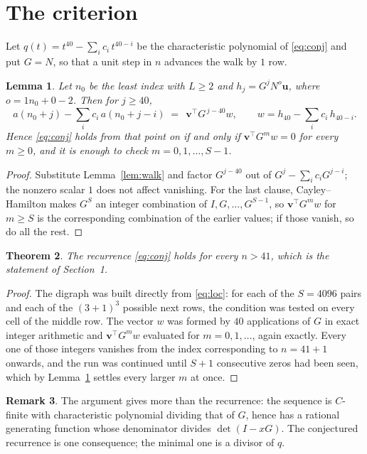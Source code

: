 \documentclass[11pt,a4paper]{article}
\theoremstyle{plain}
\newtheorem{theorem}{Theorem}
\newtheorem{lemma}[theorem]{Lemma}
\theoremstyle{definition}
\newtheorem{remark}[theorem]{Remark}
\begin{document}
\section{The criterion}

Let $q(t)=t^{40}-\sum_i c_i\,t^{40-i}$ be the characteristic polynomial of
\eqref{eq:conj} and put $G=N$, so that a unit step in $n$ advances the walk by
$1$ row.

\begin{lemma}\label{lem:crit}
Let $n_0$ be the least index with $L\ge2$ and $h_j=G^{j}N^{o}\mathbf{u}$, where
$o=1n_0+0-2$. Then for $j\ge40$,
\[
a(n_0+j)-\sum_i c_i\,a(n_0+j-i)\;=\;\,\mathbf{v}^{\!\top}G^{\,j-40}w,
\qquad w=h_{40}-\sum_i c_i\,h_{40-i} .
\]
Hence \eqref{eq:conj} holds from that point on if and only if
$\mathbf{v}^{\!\top}G^{m}w=0$ for every $m\ge0$, and it is enough to check
$m=0,1,\dots,S-1$.
\end{lemma}

\begin{proof}
Substitute Lemma~\ref{lem:walk} and factor $G^{j-40}$ out of
$G^{j}-\sum_ic_iG^{j-i}$; the nonzero scalar $1$ does not affect
vanishing. For the last clause, Cayley--Hamilton makes $G^{S}$ an integer combination of
$I,G,\dots,G^{S-1}$, so $\mathbf{v}^{\!\top}G^{m}w$ for $m\ge S$ is the corresponding
combination of the earlier values; if those vanish, so do all the rest.
\end{proof}

\begin{theorem}
The recurrence \eqref{eq:conj} holds for every $n>41$, which is the statement of
Section~1.
\end{theorem}

\begin{proof}
The digraph was built directly from \eqref{eq:loc}: for each of the $S=4096$ pairs and each
of the $(3+1)^{3}$ possible next rows, the condition was tested on every cell of
the middle row. The vector $w$ was formed by $40$ applications of $G$ in exact integer
arithmetic and $\mathbf{v}^{\!\top}G^{m}w$ evaluated for $m=0,1,\dots$, again exactly.
Every one of those integers vanishes from the index corresponding to $n=41+1$ onwards,
and the run was continued until $S+1$ consecutive zeros had been seen, which by
Lemma~\ref{lem:crit} settles every larger $m$ at once.
\end{proof}

\begin{remark}
The argument gives more than the recurrence: the sequence is $C$-finite with characteristic
polynomial dividing that of $G$, hence has a rational generating function whose denominator
divides $\det(I-xG)$. The conjectured recurrence is one consequence; the minimal one is a
divisor of $q$.
\end{remark}
\end{document}
